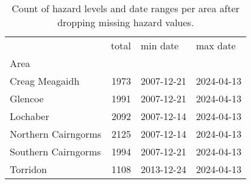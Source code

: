 \begin{table}[H]
\caption{Count of hazard levels and date ranges per area after dropping missing hazard values.}
\label{tbl:sais_area_breakdown}
\begin{tabular}{lrll}
\toprule
 & total & min date & max date \\
Area &  &  &  \\
\midrule
Creag Meagaidh & 1973 & 2007-12-21 & 2024-04-13 \\
Glencoe & 1991 & 2007-12-21 & 2024-04-13 \\
Lochaber & 2092 & 2007-12-14 & 2024-04-13 \\
Northern Cairngorms & 2125 & 2007-12-14 & 2024-04-13 \\
Southern Cairngorms & 1994 & 2007-12-21 & 2024-04-13 \\
Torridon & 1108 & 2013-12-24 & 2024-04-13 \\
\bottomrule
\end{tabular}
\end{table}
